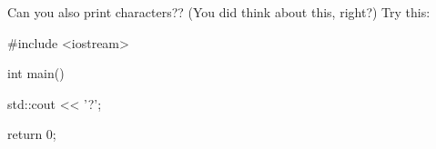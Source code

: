 Can you also print characters?? (You did think about this, right?) Try this:
\begin{console}
#include <iostream>

int main()
{
    std::cout << '?';

    return 0;
}
\end{console}
